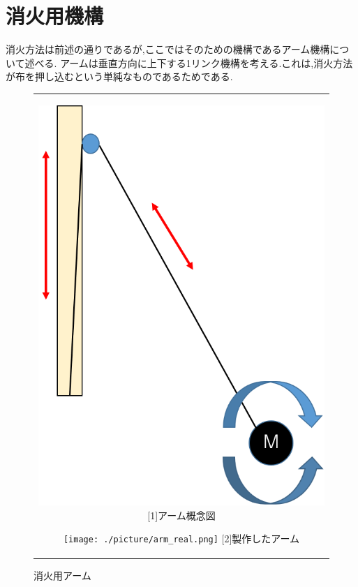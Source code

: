 \documentclass[10pt,a4j]{jarticle}
\begin{document}
\section{消火用機構}
消火方法は前述の通りであるが,ここではそのための機構であるアーム機構について述べる.
アームは垂直方向に上下する1リンク機構を考える.これは,消火方法が布を押し込むという単純なものであるためである.

\begin{figure}[h]
 \centering
 \begin{tabular}{c}
  
  \begin{minipage}{0.3\hsize}
   \centering
   \includegraphics[clip,scale=0.3]{./picture/arm_img.png}
   \hspace{1cm} [1]アーム概念図
  \end{minipage}
  
  \begin{minipage}{0.45\hsize}
   \centering
   \texttt{[image: ./picture/arm\_real.png]}
   \hspace{1.6cm} [2]製作したアーム
  \end{minipage}
 \end{tabular}
 \caption{消火用アーム}
 \label{arm}
\end{figure}





\end{document}
